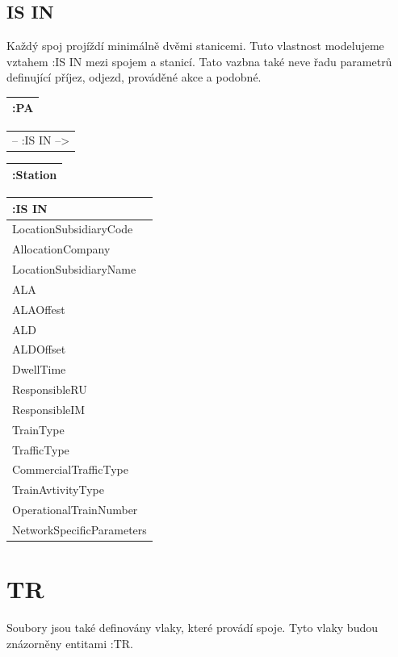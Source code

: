 \documentclass[10pt,xcolor=pdflatex,dvipsnames,table,oneside]{book}
\begin{document}
\subsection{IS IN}
Každý spoj projíždí minimálně dvěmi stanicemi. Tuto vlastnost modelujeme vztahem :IS IN mezi spojem a stanicí.
Tato vazbna také neve řadu parametrů definující příjez, odjezd, prováděné akce a podobné.

\vspace{1em}
\begin{tabular}{|l|}
    \hline
    :PA \\
    \hline
\end{tabular}
\begin{tabular}{c}
    -- :IS IN --> \\
\end{tabular}
\begin{tabular}{|l|}
    \hline
    :Station \\
    \hline
\end{tabular}

\vspace{1em}
\begin{tabular}{|l|}
    \hline
    :IS IN \\
    \hline
    LocationSubsidiaryCode \\
    AllocationCompany \\
    LocationSubsidiaryName \\
    ALA \\
    ALAOffest \\
    ALD \\
    ALDOffset \\
    DwellTime \\
    ResponsibleRU \\
    ResponsibleIM \\
    TrainType \\
    TrafficType \\
    CommercialTrafficType \\
    TrainAvtivityType \\
    OperationalTrainNumber \\
    NetworkSpecificParameters \\
    \hline
\end{tabular}

\section{TR}
Soubory jsou také definovány vlaky, které provádí spoje. Tyto vlaky budou znázorněny entitami :TR.
\end{document}
